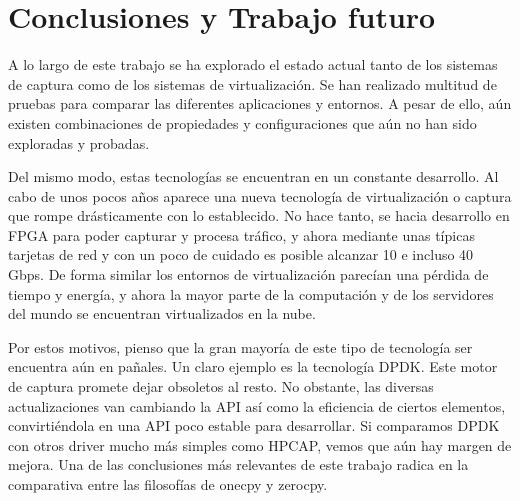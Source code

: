 \chapter{Conclusiones y Trabajo futuro\label{sec:conclusiones}}

A lo largo de este trabajo se ha explorado el estado actual tanto de los sistemas de captura como de los sistemas de virtualización. Se han realizado multitud de pruebas para comparar las diferentes aplicaciones y entornos. A pesar de ello, aún existen combinaciones de propiedades y configuraciones que aún no han sido exploradas y probadas.

Del mismo modo, estas tecnologías se encuentran en un constante desarrollo. Al cabo de unos pocos años aparece una nueva tecnología de virtualización o captura que rompe drásticamente con lo establecido. No hace tanto, se hacia desarrollo en FPGA para poder capturar y procesa tráfico, y ahora mediante unas típicas tarjetas de red y con un poco de cuidado es posible alcanzar 10 e incluso 40 Gbps. De forma similar los entornos de virtualización parecían una pérdida de tiempo y energía, y ahora la mayor parte de la computación y de los servidores del mundo se encuentran virtualizados en la nube.

Por estos motivos, pienso que la gran mayoría de este tipo de tecnología ser encuentra aún en pañales. Un claro ejemplo es la tecnología DPDK. Este motor de captura promete dejar obsoletos al resto. No obstante, las diversas actualizaciones van cambiando la API así como la eficiencia de ciertos elementos, convirtiéndola en una API poco estable para desarrollar. Si comparamos DPDK con otros driver mucho más simples como HPCAP, vemos que aún hay margen de mejora. Una de las conclusiones más relevantes de este trabajo radica en la comparativa entre las filosofías de onecpy y zerocpy.


